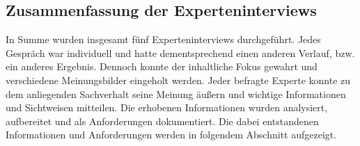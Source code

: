 \subsection{Zusammenfassung der Experteninterviews}
    In Summe wurden insgesamt fünf Experteninterviews durchgeführt. Jedes Gespräch war individuell und hatte dementsprechend 
    einen anderen Verlauf, bzw. ein anderes Ergebnis. Dennoch konnte der inhaltliche Fokus gewahrt und verschiedene 
    Meinungsbilder eingeholt werden. Jeder befragte Experte konnte zu dem anliegenden Sachverhalt seine Meinung äußern und 
    wichtige Informationen und Sichtweisen mitteilen. Die erhobenen Informationen wurden analysiert, aufbereitet und 
    als Anforderungen dokumentiert. Die dabei entstandenen Informationen und Anforderungen werden in 
    folgendem Abschnitt aufgezeigt. 
    
